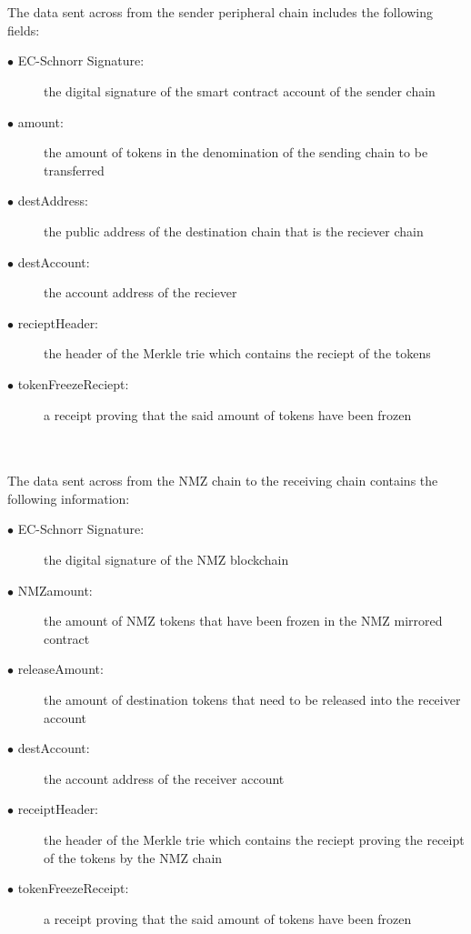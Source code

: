 \documentclass[a4paper,twoside,phd]{BYUPhys}
\begin{document}
\\
\\
The data sent across from the sender peripheral chain includes the following fields:
\begin{description}
    \item[$\bullet$ EC-Schnorr Signature:] the digital signature of the smart contract account of the sender chain
    \item[$\bullet$ amount:] the amount of tokens in the denomination of the sending chain to be transferred
    \item[$\bullet$ destAddress:] the public address of the destination chain that is the reciever chain
    \item[$\bullet$ destAccount:] the account address of the reciever
    \item[$\bullet$ recieptHeader:] the header of the Merkle trie which contains the reciept of the tokens
    \item[$\bullet$ tokenFreezeReciept:] a receipt proving that the said amount of tokens have been frozen
\end{description}
\\
\\
The data sent across from the NMZ chain to the receiving chain contains the following information:
\begin{description}
    \item[$\bullet$ EC-Schnorr Signature:] the digital signature of the NMZ blockchain
    \item[$\bullet$ NMZamount:] the amount of NMZ tokens that have been frozen in the NMZ mirrored contract
    \item[$\bullet$ releaseAmount:] the amount of destination tokens that need to be released into the receiver account
    \item[$\bullet$ destAccount:] the account address of the receiver account
    \item[$\bullet$ receiptHeader:] the header of the Merkle trie which contains the reciept proving the receipt of the tokens by the NMZ chain
    \item[$\bullet$ tokenFreezeReceipt:] a receipt proving that the said amount of tokens have been frozen
\end{description}
\end{document}
